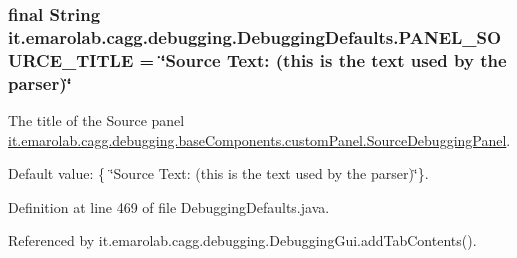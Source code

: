 \hypertarget{classit_1_1emarolab_1_1cagg_1_1debugging_1_1DebuggingDefaults_a2cfae17841a8677e7bbdd0280676b4b9}{
\subsubsection[{P\-A\-N\-E\-L\-\_\-\-S\-O\-U\-R\-C\-E\-\_\-\-T\-I\-T\-L\-E}]{\setlength{\rightskip}{0pt plus 5cm}final String it.\-emarolab.\-cagg.\-debugging.\-Debugging\-Defaults.\-P\-A\-N\-E\-L\-\_\-\-S\-O\-U\-R\-C\-E\-\_\-\-T\-I\-T\-L\-E = \char`\"{}Source Text\-: (this is the text used by the parser)\char`\"{}\hspace{0.3cm}{\ttfamily [static]}}}\label{classit_1_1emarolab_1_1cagg_1_1debugging_1_1DebuggingDefaults_a2cfae17841a8677e7bbdd0280676b4b9}
The title of the Source panel \hyperlink{classit_1_1emarolab_1_1cagg_1_1debugging_1_1baseComponents_1_1customPanel_1_1SourceDebuggingPanel}{it.\-emarolab.\-cagg.\-debugging.\-base\-Components.\-custom\-Panel.\-Source\-Debugging\-Panel}.\par
 Default value\-: \{ \char`\"{}\-Source Text\-: (this is the text used by the parser)\char`\"{}\}. 

Definition at line 469 of file Debugging\-Defaults.\-java.



Referenced by it.\-emarolab.\-cagg.\-debugging.\-Debugging\-Gui.\-add\-Tab\-Contents().

